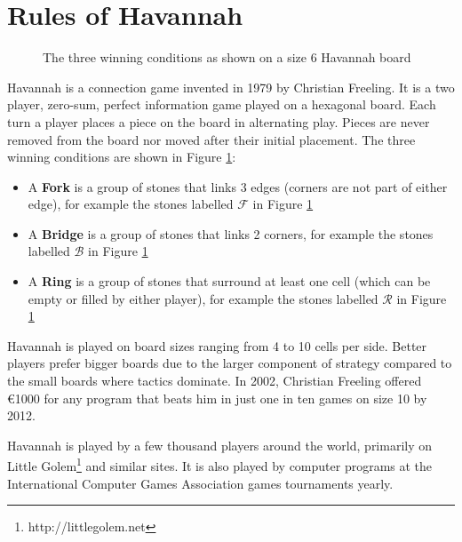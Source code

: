 


\section{Rules of Havannah}


\begin{figure}[tb]
\centering
\begin{HavannahBoard}[board size=6,coordinate style=classical]
\end{HavannahBoard}
\caption{The three winning conditions as shown on a size 6 Havannah board}
\label{fig:rules}
\end{figure}

Havannah is a connection game invented in 1979 by Christian Freeling. It is a two player, zero-sum, perfect information game played on a hexagonal board. Each turn a player places a piece on the board in alternating play. Pieces are never removed from the board nor moved after their initial placement. The three winning conditions are shown in Figure \ref{fig:rules}:
\begin{itemize}
	\setlength{\itemsep}{0pt}
	\setlength{\parskip}{0pt}
	\setlength{\parsep}{0pt}
	\item A \textbf{Fork} is a group of stones that links 3 edges (corners are not part of either edge), for example the stones labelled $\mathcal F$ in Figure \ref{fig:rules}
	\item A \textbf{Bridge} is a group of stones that links 2 corners, for example the stones labelled $\mathcal B$ in Figure \ref{fig:rules}
	\item A \textbf{Ring} is a group of stones that surround at least one cell (which can be empty or filled by either player), for example the stones labelled $\mathcal R$ in Figure \ref{fig:rules}
\end{itemize}

Havannah is played on board sizes ranging from 4 to 10 cells per side. Better players prefer bigger boards due to the larger component of strategy compared to the small boards where tactics dominate. In 2002, Christian Freeling offered \euro 1000 for any program that beats him in just one in ten games on size 10 by 2012.

Havannah is played by a few thousand players around the world, primarily on Little Golem\footnote{http://littlegolem.net} and similar sites. It is also played by computer programs at the International Computer Games Association games tournaments yearly.


